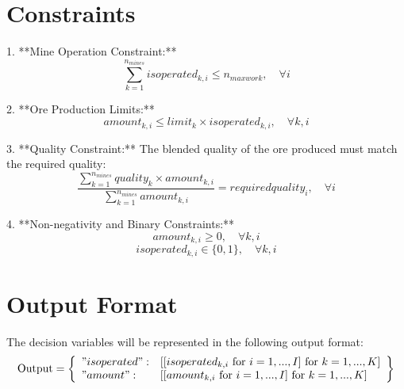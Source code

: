 \documentclass{article}
\begin{document}
\section*{Constraints}
1. **Mine Operation Constraint:**
   \[
   \sum_{k=1}^{n_{mines}} isoperated_{k,i} \leq n_{maxwork}, \quad \forall i
   \]

2. **Ore Production Limits:**
   \[
   amount_{k,i} \leq limit_k \times isoperated_{k,i}, \quad \forall k, i
   \]

3. **Quality Constraint:**
   The blended quality of the ore produced must match the required quality:
   \[
   \frac{\sum_{k=1}^{n_{mines}} quality_k \times amount_{k,i}}{\sum_{k=1}^{n_{mines}} amount_{k,i}} = requiredquality_i, \quad \forall i
   \]

4. **Non-negativity and Binary Constraints:**
   \[
   amount_{k,i} \geq 0, \quad \forall k, i
   \]
   \[
   isoperated_{k,i} \in \{0, 1\}, \quad \forall k, i
   \]

\section*{Output Format}
The decision variables will be represented in the following output format:
\[
\text{Output} = \left\{ 
\begin{array}{ll}
    "isoperated": & [[isoperated_{k,i} \text{ for } i = 1,...,I] \text{ for } k = 1,...,K] \\
    "amount": & [[amount_{k,i} \text{ for } i = 1,...,I] \text{ for } k = 1,...,K]
\end{array}
\right\}
\]
\end{document}
